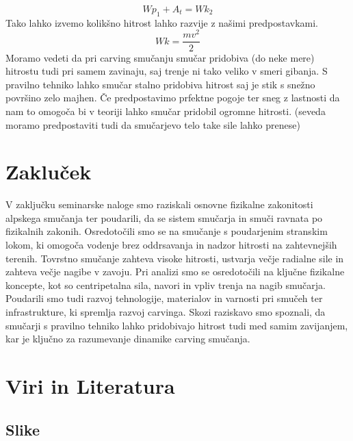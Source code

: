 \documentclass{article}
\begin{document}
\[Wp_1+A_t=Wk_2\]
Tako lahko izvemo kolikšno hitrost lahko razvije z našimi predpostavkami. 
\[Wk=\frac{mv^2}{2}\]
Moramo vedeti da pri carving smučanju smučar pridobiva (do neke mere) hitrostu tudi pri samem zavinaju, saj trenje ni tako veliko v smeri gibanja.
S pravilno tehniko lahko smučar stalno pridobiva hitrost saj je stik s snežno površino zelo majhen. Če predpostavimo prfektne pogoje ter 
sneg z lastnosti da nam to omogoča bi v teoriji lahko smučar pridobil ogromne hitrosti. (seveda moramo predpostaviti tudi da smučarjevo telo take sile lahko prenese)
\section{Zakluček}
V zaključku seminarske naloge smo raziskali osnovne fizikalne zakonitosti alpskega smučanja ter poudarili, da se sistem smučarja in smuči ravnata po fizikalnih zakonih. Osredotočili smo se na smučanje s poudarjenim stranskim lokom, ki omogoča vodenje brez oddrsavanja in nadzor hitrosti na zahtevnejših terenih. Tovrstno smučanje zahteva visoke hitrosti, ustvarja večje radialne sile in zahteva večje nagibe v zavoju. Pri analizi smo se osredotočili na ključne fizikalne koncepte, kot so centripetalna sila, navori in vpliv trenja na nagib smučarja. Poudarili smo tudi razvoj tehnologije, materialov in varnosti pri smučeh ter infrastrukture, ki spremlja razvoj carvinga. Skozi raziskavo smo spoznali, da smučarji s pravilno tehniko lahko pridobivajo hitrost tudi med samim zavijanjem, kar je ključno za razumevanje dinamike carving smučanja.

\newpage

\section{Viri in Literatura}

\subsection{Slike}
\end{document}
